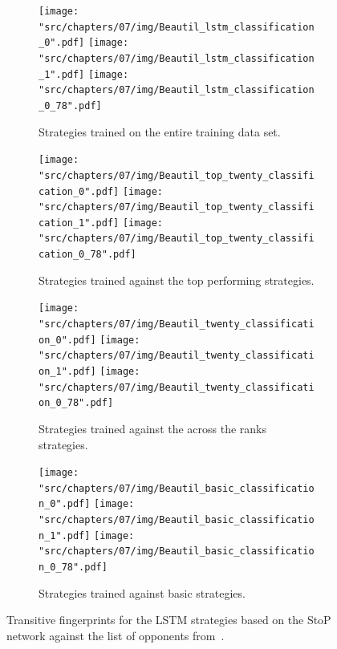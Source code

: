 \begin{figure}[!htbp]
    \begin{subfigure}{\textwidth}
        \texttt{[image: "src/chapters/07/img/Beautil\_lstm\_classification\_0".pdf]}
        \texttt{[image: "src/chapters/07/img/Beautil\_lstm\_classification\_1".pdf]}
        \texttt{[image: "src/chapters/07/img/Beautil\_lstm\_classification\_0\_78".pdf]}
        \caption{Strategies trained on the entire training data set.}
    \end{subfigure}
    \begin{subfigure}{\textwidth}
        \texttt{[image: "src/chapters/07/img/Beautil\_top\_twenty\_classification\_0".pdf]}
        \texttt{[image: "src/chapters/07/img/Beautil\_top\_twenty\_classification\_1".pdf]}
        \texttt{[image: "src/chapters/07/img/Beautil\_top\_twenty\_classification\_0\_78".pdf]}
        \caption{Strategies trained against the top performing strategies.}
    \end{subfigure}
    \begin{subfigure}{\textwidth}
        \texttt{[image: "src/chapters/07/img/Beautil\_twenty\_classification\_0".pdf]}
        \texttt{[image: "src/chapters/07/img/Beautil\_twenty\_classification\_1".pdf]}
        \texttt{[image: "src/chapters/07/img/Beautil\_twenty\_classification\_0\_78".pdf]}
        \caption{Strategies trained against the across the ranks strategies.}
    \end{subfigure}
    \begin{subfigure}{\textwidth}
        \texttt{[image: "src/chapters/07/img/Beautil\_basic\_classification\_0".pdf]}
        \texttt{[image: "src/chapters/07/img/Beautil\_basic\_classification\_1".pdf]}
        \texttt{[image: "src/chapters/07/img/Beautil\_basic\_classification\_0\_78".pdf]}
        \caption{Strategies trained against basic strategies.}
    \end{subfigure}
    \caption{Transitive fingerprints for the LSTM strategies based on the StoP
    network against the list of opponents from~\cite{Beaufils1997}.}\label{fig:transitive_fingerprints_beautil_s_to_p}
\end{figure}



